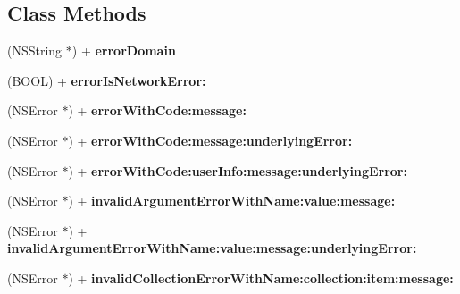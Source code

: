 \subsection*{Class Methods}
\begin{DoxyCompactItemize}
\item 
\hypertarget{interface_f_b_s_d_k_error_a756dc202d2a690f13a7aeb1dcbeb0838}{(N\-S\-String $\ast$) + {\bfseries error\-Domain}}\label{interface_f_b_s_d_k_error_a756dc202d2a690f13a7aeb1dcbeb0838}

\item 
\hypertarget{interface_f_b_s_d_k_error_ac3d2a46ae9374896afdd4520dd3e3d50}{(B\-O\-O\-L) + {\bfseries error\-Is\-Network\-Error\-:}}\label{interface_f_b_s_d_k_error_ac3d2a46ae9374896afdd4520dd3e3d50}

\item 
\hypertarget{interface_f_b_s_d_k_error_a7700951a8ad1c1ea8a8d1b0b4b69b762}{(N\-S\-Error $\ast$) + {\bfseries error\-With\-Code\-:message\-:}}\label{interface_f_b_s_d_k_error_a7700951a8ad1c1ea8a8d1b0b4b69b762}

\item 
\hypertarget{interface_f_b_s_d_k_error_a7f5ed52974d9553c0761dbd9f2b5f423}{(N\-S\-Error $\ast$) + {\bfseries error\-With\-Code\-:message\-:underlying\-Error\-:}}\label{interface_f_b_s_d_k_error_a7f5ed52974d9553c0761dbd9f2b5f423}

\item 
\hypertarget{interface_f_b_s_d_k_error_a1a35a46098fc1f78a60caee6337f14a0}{(N\-S\-Error $\ast$) + {\bfseries error\-With\-Code\-:user\-Info\-:message\-:underlying\-Error\-:}}\label{interface_f_b_s_d_k_error_a1a35a46098fc1f78a60caee6337f14a0}

\item 
\hypertarget{interface_f_b_s_d_k_error_a50c537dca64b8dcd47d02c52bc76ce64}{(N\-S\-Error $\ast$) + {\bfseries invalid\-Argument\-Error\-With\-Name\-:value\-:message\-:}}\label{interface_f_b_s_d_k_error_a50c537dca64b8dcd47d02c52bc76ce64}

\item 
\hypertarget{interface_f_b_s_d_k_error_a769154f5ddf9f64460da391a3c8ed390}{(N\-S\-Error $\ast$) + {\bfseries invalid\-Argument\-Error\-With\-Name\-:value\-:message\-:underlying\-Error\-:}}\label{interface_f_b_s_d_k_error_a769154f5ddf9f64460da391a3c8ed390}

\item 
\hypertarget{interface_f_b_s_d_k_error_a56a4b9b01c0dcd757e48f155e1828885}{(N\-S\-Error $\ast$) + {\bfseries invalid\-Collection\-Error\-With\-Name\-:collection\-:item\-:message\-:}}\label{interface_f_b_s_d_k_error_a56a4b9b01c0dcd757e48f155e1828885}


\end{DoxyCompactItemize}
